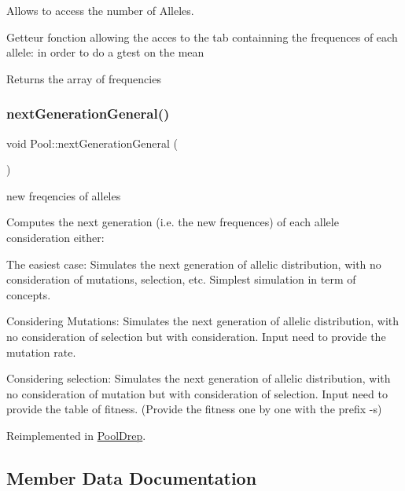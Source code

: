 Allows to access the number of Alleles. 

Getteur fonction allowing the acces to the tab containning the frequences of each allele\+: in order to do a gtest on the mean \begin{DoxyReturn}{Returns}
the array of frequencies 
\end{DoxyReturn}
\hypertarget{class_pool_ad497f611cb592a6dd13f07b217bfd350}{}\label{class_pool_ad497f611cb592a6dd13f07b217bfd350} 
\subsubsection{\texorpdfstring{next\+Generation\+General()}{nextGenerationGeneral()}}
{\footnotesize\ttfamily void Pool\+::next\+Generation\+General (\begin{DoxyParamCaption}{ }\end{DoxyParamCaption})\hspace{0.3cm}{\ttfamily [virtual]}}



new freqencies of alleles 

Computes the next generation (i.\+e. the new frequences) of each allele consideration either\+:


\begin{DoxyItemize}
\item The easiest case\+: Simulates the next generation of allelic distribution, with no consideration of mutations, selection, etc. Simplest simulation in term of concepts.
\item Considering Mutations\+: Simulates the next generation of allelic distribution, with no consideration of selection but with consideration. Input need to provide the mutation rate.
\item Considering selection\+: Simulates the next generation of allelic distribution, with no consideration of mutation but with consideration of selection. Input need to provide the table of fitness. (Provide the fitness one by one with the prefix -\/s) 
\end{DoxyItemize}

Reimplemented in \hyperlink{class_pool_drep_a4fba163580813690fbeb2d4ad0841a86}{Pool\+Drep}.



\subsection{Member Data Documentation}
\hypertarget{class_pool_ab45fcdb067197181cace169cf12aedd2}{}\label{class_pool_ab45fcdb067197181cace169cf12aedd2} 
